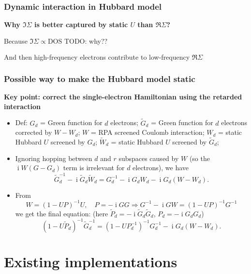 \documentclass{beamer}
\DeclareMathOperator{\ii}{i}
\begin{document}
\begin{frame}
\frametitle{Dynamic interaction in Hubbard model}

\textbf{Why $\Im \Sigma$ is better captured by static $U$ than $\Re \Sigma$?}

Because $\Im \Sigma \propto \text{DOS}$ TODO: why??

And then high-frequency electrons contribute to low-frequency $\Re \Sigma$ 

\end{frame}

\begin{frame}
\frametitle{Possible way to make the Hubbard model static}

\textbf{Key point: correct the single-electron Hamiltonian using the retarded interaction}

\begin{itemize}
    \item Def: $G_d$ = Green function for $d$ electrons; 
        $\tilde{G}_d$ = Green function for $d$ electrons corrected by $W - W_d$; 
        $W$ = RPA screened Coulomb interaction; 
        $W_d$ = static Hubbard $U$ screened by $G_d$; 
        $\tilde{W}_d$ = static Hubbard $U$ screened by $\tilde{G}_d$;
    \item Ignoring hopping between $d$ and $r$ subspaces caused by $W$
        (so the $\ii W (G - G_d)$ term is irrelevant for $d$ electrons), we have 
        \begin{equation}
            \tilde{G}_d^{-1} - \ii \tilde{G}_d \tilde{W}_d = 
            G_d^{-1} - \ii G_d W_d - \ii G_d (W - W_d).
        \end{equation}
    \item  From
    \begin{equation}
        W = (1 - UP)^{-1} U, \quad P = - \ii G G \Rightarrow
        G^{-1} - \ii GW = (1 - UP)^{-1} G^{-1} 
    \end{equation} 
    we get the final equation: 
    (here $\tilde{P}_d = - \ii \tilde{G}_d \tilde{G}_d$, 
    $P_d = - \ii G_d G_d$)
    \begin{equation}
            (1 - U \tilde{P}_d)^{-1} \tilde{G}_d^{-1}
            = (1 - U P_d^{-1})^{-1} G_d^{-1}
            - \ii G_d  (W -W_d).
        \end{equation}
\end{itemize}

\end{frame}

\section{Existing implementations}
\end{document}
